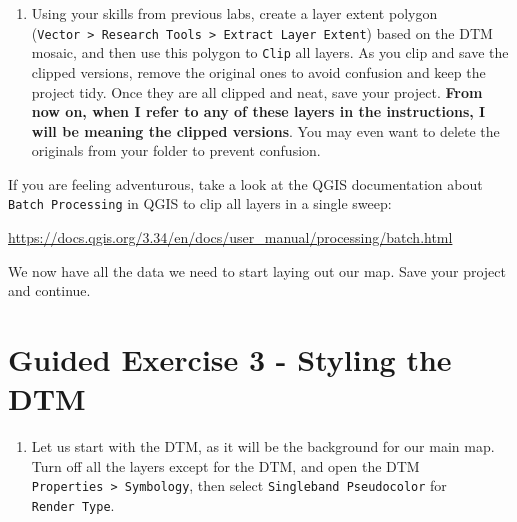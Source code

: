 \documentclass[
  letterpaper,
  DIV=11,
  numbers=noendperiod]{scrreprt}
\providecommand{\tightlist}{%
  \setlength{\itemsep}{0pt}\setlength{\parskip}{0pt}}\usepackage{longtable,booktabs,array}
\begin{document}
\begin{enumerate}
\def\labelenumi{(\arabic{enumi})}
\setcounter{enumi}{198}
\tightlist
\item
  Using your skills from previous labs, create a layer extent polygon
  (\texttt{Vector\ \textgreater{}\ Research\ Tools\ \textgreater{}\ Extract\ Layer\ Extent})
  based on the DTM mosaic, and then use this polygon to \texttt{Clip}
  all layers. As you clip and save the clipped versions, remove the
  original ones to avoid confusion and keep the project tidy. Once they
  are all clipped and neat, save your project. \textbf{From now on, when
  I refer to any of these layers in the instructions, I will be meaning
  the clipped versions}. You may even want to delete the originals from
  your folder to prevent confusion.
\end{enumerate}

\begin{tcolorbox}[enhanced jigsaw, coltitle=black, toprule=.15mm, breakable, opacitybacktitle=0.6, left=2mm, colback=white, leftrule=.75mm, rightrule=.15mm, colbacktitle=quarto-callout-tip-color!10!white, toptitle=1mm, titlerule=0mm, colframe=quarto-callout-tip-color-frame, arc=.35mm, bottomtitle=1mm, opacityback=0, bottomrule=.15mm, title=\textcolor{quarto-callout-tip-color}{\faLightbulb}\hspace{0.5em}{Tip}]

If you are feeling adventurous, take a look at the QGIS documentation
about \texttt{Batch\ Processing} in QGIS to clip all layers in a single
sweep:

\url{https://docs.qgis.org/3.34/en/docs/user_manual/processing/batch.html}

\end{tcolorbox}

We now have all the data we need to start laying out our map. Save your
project and continue.

\section{Guided Exercise 3 - Styling the
DTM}\label{guided-exercise-3---styling-the-dtm}

\begin{enumerate}
\def\labelenumi{(\arabic{enumi})}
\setcounter{enumi}{199}
\tightlist
\item
  Let us start with the DTM, as it will be the background for our main
  map. Turn off all the layers except for the DTM, and open the DTM
  \texttt{Properties\ \textgreater{}\ Symbology}, then select
  \texttt{Singleband\ Pseudocolor} for \texttt{Render\ Type}.
\end{enumerate}
\end{document}

